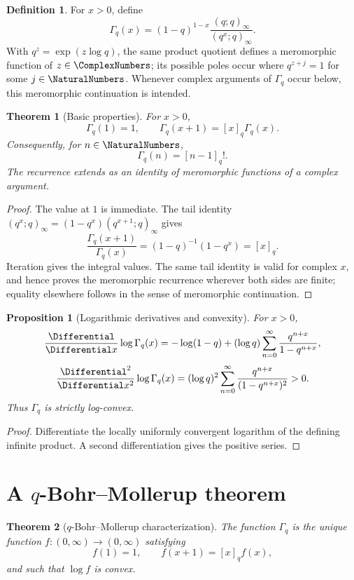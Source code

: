 \documentclass[11pt,a4paper,oneside,openany]{book}
\newtheorem{theorem}{Theorem}[chapter]
\newtheorem{proposition}[proposition]{Proposition}
\theoremstyle{definition}
\newtheorem{definition}[definition]{Definition}
\theoremstyle{remark}
\begin{document}
\begin{definition}
For $x>0$, define
\[
 \Gamma_q(x)
 =(1-q)^{1-x}\frac{(q;q)_\infty}{(q^x;q)_\infty}.
\]
With $q^z=\exp(z\log q)$, the same product quotient defines a
meromorphic function of $z\in\ComplexNumbers$; its possible poles occur where
$q^{z+j}=1$ for some $j\in\NaturalNumbers$.  Whenever complex arguments of
$\Gamma_q$ occur below, this meromorphic continuation is intended.
\end{definition}

\begin{theorem}[Basic properties]\label{thm:qgamma-basic}
For $x>0$,
\[
 \Gamma_q(1)=1,
 \qquad
 \Gamma_q(x+1)=[x]_q\Gamma_q(x).
\]
Consequently, for $n\in\NaturalNumbers$,
\[
 \Gamma_q(n)=[n-1]_q!.
\]
The recurrence extends as an identity of meromorphic functions of a
complex argument.
\end{theorem}

\begin{proof}
The value at $1$ is immediate.  The tail identity
\(
 (q^x;q)_\infty=(1-q^x)(q^{x+1};q)_\infty
\)
gives
\[
 \frac{\Gamma_q(x+1)}{\Gamma_q(x)}
 =(1-q)^{-1}(1-q^x)=[x]_q.
\]
Iteration gives the integral values.  The same tail identity is valid for
complex $x$, and hence proves the meromorphic recurrence wherever both
sides are finite; equality elsewhere follows in the sense of
meromorphic continuation.
\end{proof}

\begin{proposition}[Logarithmic derivatives and convexity]\label{prop:qgamma-convex}
For $x>0$,
\[
 \frac{\Differential}{\Differential x}\log\Gamma_q(x)
 =-\log(1-q)+(\log q)\sum_{n=0}^{\infty}
 \frac{q^{n+x}}{1-q^{n+x}},
\]
\[
 \frac{\Differential^2}{\Differential x^2}\log\Gamma_q(x)
 = (\log q)^2\sum_{n=0}^{\infty}
 \frac{q^{n+x}}{(1-q^{n+x})^2}>0.
\]
Thus $\Gamma_q$ is strictly log-convex.
\end{proposition}

\begin{proof}
Differentiate the locally uniformly convergent logarithm of the defining infinite product.  A second differentiation gives the positive series.
\end{proof}

\section{A \texorpdfstring{$q$}{q}-Bohr--Mollerup theorem}

\begin{theorem}[$q$-Bohr--Mollerup characterization]\label{thm:q-bohr-mollerup}
The function $\Gamma_q$ is the unique function $f:(0,\infty)\to(0,\infty)$ satisfying
\[
 f(1)=1,
 \qquad
 f(x+1)=[x]_qf(x),
\]
and such that $\log f$ is convex.
\end{theorem}
\end{document}
